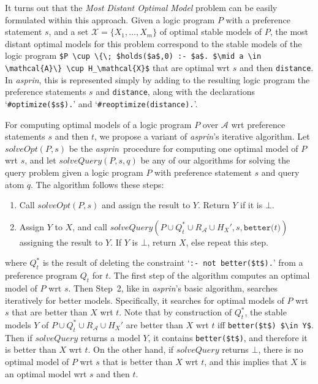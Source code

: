 \documentclass[a4paper,UKenglish]{oasics}
\newcommand{\lm}[1]{\lstinline[mathescape=true]!#1!}
\newcommand{\sysfont}{\textit}
\newcommand{\asprin}{\sysfont{asprin}}
\begin{document}
It turns out that the \emph{Most Distant Optimal Model} problem can be easily formulated within this approach.
%
Given a logic program $P$ with a preference statement $s$, 
and a set $\mathcal{X}=\{ X_1, \ldots, X_m \}$ of optimal stable models of $P$, 
the most distant optimal models for this problem correspond to the stable models of the logic program
\lstinline[mathescape=true]!$P \cup \{\; $holds($a$,0) :- $a$. $\mid a \in \mathcal{A}\} \cup H_\mathcal{X}$!
that are optimal wrt $s$ and then \lm{distance}.
%
In \asprin, this is represented simply by adding to the resulting logic program 
the preference statements $s$ and \lm{distance}, 
along with the declarations `\lm{#optimize($s$).}' and `\lm{#reoptimize(distance).}'.

For computing optimal models of a logic program $P$ over $\mathcal{A}$ wrt preference statements $s$ and then $t$, 
we propose a variant of \asprin's iterative algorithm.
%
Let $\mathit{solveOpt}(P,s)$ be the \asprin\ procedure for computing one optimal model of $P$ wrt $s$, 
and let $\mathit{solveQuery}(P,s,q)$ be any of our algorithms for solving the query problem  
given a logic program $P$ with preference statement $s$ and query atom $q$.
%
The algorithm follows these steps:
\begin{enumerate}
\item
Call $\mathit{solveOpt}(P,s)$ and assign the result to $Y$. Return $Y$ if it is $\bot$.
\item
Assign $Y$ to $X$, and call $\mathit{solveQuery}(P \cup Q_t^* \cup R_\mathcal{A} \cup H_{X}',s,\mathtt{better(}t\mathtt{)})$ assigning the result to $Y$.
If $Y$ is $\bot$, return $X$, else repeat this step.
\end{enumerate}
where $Q_t^*$ is the result of deleting the constraint `\lm{:- not better($t$).}' 
from a preference program $Q_t$ for $t$.
%
The first step of the algorithm computes an optimal model of $P$ wrt $s$.
%
Then Step~2, like in \asprin's basic algorithm, searches iteratively for better models. 
%
Specifically, it searches for optimal models of $P$ wrt $s$ that are better than $X$ wrt $t$.
%
Note that by construction of $Q_t^*$, 
the stable models $Y$ of $P \cup Q_t^* \cup R_\mathcal{A} \cup H_{X}'$ 
are better than $X$ wrt $t$ iff \lm{better($t$) $\in Y$}. 
%
Then if $\mathit{solveQuery}$ returns a model $Y$, it contains \lm{better($t$)},
and therefore it is better than $X$ wrt $t$.
%
On the other hand, if $\mathit{solveQuery}$ returns $\bot$, there is no optimal model of $P$ wrt $s$ that is better than $X$ wrt $t$, 
and this implies that $X$ is an optimal model wrt $s$ and then $t$.
\end{document}
